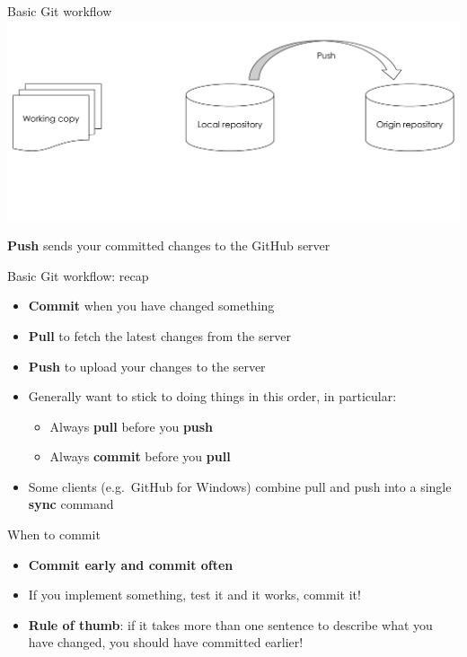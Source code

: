 \begin{frame}{Basic Git workflow}
    \includegraphics[width=\textwidth]{github_workflow_4}
    
    \textbf{Push} sends your committed changes to the GitHub server
\end{frame}

\begin{frame}{Basic Git workflow: recap}
    \begin{itemize}
        \item \textbf{Commit} when you have changed something
        \item \textbf{Pull} to fetch the latest changes from the server
        \item \textbf{Push} to upload your changes to the server
        \item Generally want to stick to doing things in this order, in particular:
            \begin{itemize}
                \item Always \textbf{pull} before you \textbf{push}
                \item Always \textbf{commit} before you \textbf{pull}
            \end{itemize}
        \item Some clients (e.g.\ GitHub for Windows)
            combine pull and push into a single \textbf{sync} command
    \end{itemize}
\end{frame}

\begin{frame}{When to commit}
    \begin{itemize}
        \item \textbf{Commit early and commit often}
        \item If you implement something, test it and it works, commit it!
        \item \textbf{Rule of thumb}: if it takes more than one sentence to describe what you have changed,
            you should have committed earlier!
    \end{itemize}
\end{frame}

